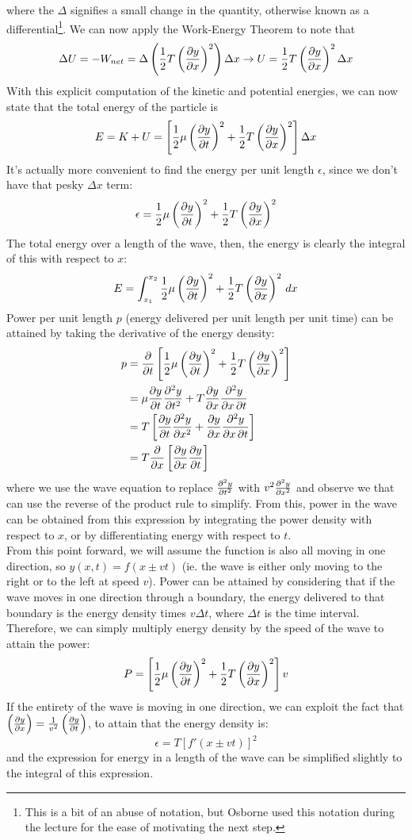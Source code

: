 where the $\Delta$ signifies a small change in the quantity, otherwise known as a differential\footnote{This is a bit of an abuse of notation, but Osborne used this notation during the lecture for the ease of motivating the next step.}. 
We can now apply the Work-Energy Theorem to note that 
$$ \Delta U = - W_{net} = \Delta \left( \frac{1}{2} T \left( \frac{\partial y}{\partial x} \right)^2 \right)  \Delta x \rightarrow U =  \frac{1}{2} T \left( \frac{\partial y}{\partial x} \right)^2 \Delta x$$
With this explicit computation of the kinetic and potential energies, we can now state that the total energy of the particle is 
$$ E = K + U = \left[\frac{1}{2} \mu \left( \frac{\partial y}{\partial t} \right)^2 + \frac{1}{2} T \left( \frac{\partial y}{\partial x} \right)^2 \right] \Delta x $$
It's actually more convenient to find the energy per unit length $\epsilon$, since we don't have that pesky $\Delta x$ term:
$$ \epsilon = \frac{1}{2} \mu \left( \frac{\partial y}{\partial t} \right)^2 + \frac{1}{2} T \left( \frac{\partial y}{\partial x} \right)^2 $$
The total energy over a length of the wave, then, the energy is clearly the integral of this with respect to $x$:
$$ E = \int_{x_1}^{x_2} \frac{1}{2} \mu \left( \frac{\partial y}{\partial t} \right)^2 + \frac{1}{2} T \left( \frac{\partial y}{\partial x} \right)^2 \, dx$$
Power per unit length $p$ (energy delivered per unit length per unit time) can be attained by taking the derivative of the energy density: 
\begin{align*}
p &= \frac{\partial }{\partial t} \left[\frac{1}{2} \mu \left( \frac{\partial y}{\partial t} \right)^2 + \frac{1}{2} T \left( \frac{\partial y}{\partial x} \right)^2  \right] \\
&= \mu \frac{\partial y}{\partial t} \frac{\partial^2 y}{\partial t^2} + T \frac{\partial y}{\partial x} \frac{\partial^2 y}{\partial x \, \partial t}  \\
&= T \left[\frac{\partial y}{\partial t} \frac{\partial^2 y}{\partial x^2} + \frac{\partial y}{\partial x} \frac{\partial^2 y}{\partial x \, \partial t} \right] \\
&= T \frac{\partial }{\partial x} \left[\frac{\partial y}{\partial x} \frac{\partial y}{\partial t} \right] 
\end{align*}
where we use the wave equation to replace $\frac{\partial^2 y}{\partial t^2}$ with $v^2 \frac{\partial^2 y}{\partial x^2}$ and observe we that can use the reverse of the product rule to simplify. From this, power in the wave can be obtained from this expression by integrating the power density with respect to $x$, or by differentiating energy with respect to $t$.\\
From this point forward, we will assume the function is also all moving in one direction, so $y(x, t) = f(x \pm vt)$ (ie. the wave is either only moving to the right or to the left at speed $v$). Power can be attained by considering that if the wave moves in one direction through a boundary, the energy delivered to that boundary is the energy density times $v \Delta t$, where $\Delta t$ is the time interval. Therefore, we can simply multiply energy density by the speed of the wave to attain the power: 
$$P = \left[\frac{1}{2} \mu \left( \frac{\partial y}{\partial t} \right)^2 + \frac{1}{2} T \left( \frac{\partial y}{\partial x} \right)^2 \right] v $$
If the entirety of the wave is moving in one direction, we can exploit the fact that $\left( \frac{\partial y}{\partial x} \right) = \frac{1}{v^2} \left( \frac{\partial y}{\partial t} \right)$, to attain that the energy density is: 
\[
	\epsilon = T [f'(x \pm vt)]^2
\]
and the expression for energy in a length of the wave can be simplified slightly to the integral of this expression. 

